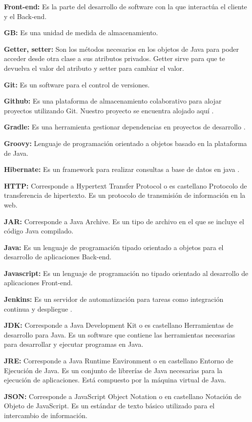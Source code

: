 \documentclass[12pt]{report} %
\begin{document}
\textbf{Front-end:} Es la parte del desarrollo de software con la que interactúa el cliente y el Back-end.

\textbf{GB:} Es una unidad de medida de almacenamiento.

\textbf{Getter, setter:} Son los métodos necesarios en los objetos de Java para poder acceder desde otra clase a sus atributos privados. Getter sirve para que te devuelva el valor del atributo y setter para cambiar el valor.

\textbf{Git:} Es un software para el control de versiones. 

\textbf{Github:} Es una plataforma de almacenamiento colaborativo para alojar proyectos utilizando Git. Nuestro proyecto se encuentra alojado aquí \cite{repositorio}.

\textbf{Gradle:} Es una herramienta gestionar dependencias en proyectos de desarrollo \cite{gradle}.

\textbf{Groovy:} Lenguaje de programación orientado a objetos basado en la plataforma de Java.

\textbf{Hibernate:} Es un framework para realizar consultas a base de datos en java \cite{hibernate}.

\textbf{HTTP:} Corresponde a Hypertext Transfer Protocol o es castellano Protocolo de transferencia de hipertexto. Es un protocolo de transmisión de información en la web.

\textbf{JAR:} Corresponde a Java Archive. Es un tipo de archivo en el que se incluye el código Java compilado.

\textbf{Java:} Es un lenguaje de programación tipado orientado a objetos para el desarrollo de aplicaciones Back-end.

\textbf{Javascript:} Es un lenguaje de programación no tipado orientado al desarrollo de aplicaciones Front-end.

\textbf{Jenkins:} Es un servidor de automatización para tareas como integración continua y despliegue \cite{jenkins}.

\textbf{JDK:} Corresponde a Java Development Kit o es castellano Herramientas de desarrollo para Java. Es un software que contiene las herramientas necesarias para desarrollar y ejecutar programas en Java.

\textbf{JRE:} Corresponde a Java Runtime Environment o en castellano Entorno de Ejecución de Java. Es un conjunto de librerías de Java necesarias para la ejecución de aplicaciones. Está compuesto por la máquina virtual de Java.

\textbf{JSON:} Corresponde a JavaScript Object Notation o en castellano Notación de Objeto de JavaScript. Es un estándar de texto básico utilizado para el intercambio de información.
\end{document}
